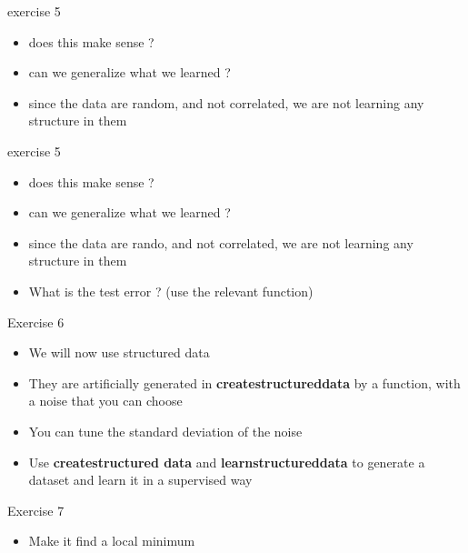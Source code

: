 \documentclass{beamer}
\begin{document}
\begin{frame}{exercise 5}
    \begin{itemize}
        \item does this make sense ?
            \item can we generalize what we learned ?
                \item since the data are random, and not correlated, we are not
                    learning any structure in them
    \end{itemize}
\end{frame}


\begin{frame}{exercise 5}
    \begin{itemize}
        \item does this make sense ?
            \item can we generalize what we learned ?
                \item since the data are rando, and not correlated, we are not
                    learning any structure in them
                \item What is the test error ? (use the relevant function)
    \end{itemize}
\end{frame}

\begin{frame}{Exercise 6}
    \begin{itemize}
        \item We will now use structured data
            \item They are artificially generated in
                \textbf{{create\textunderscore structured\textunderscore data}} by a function, with a noise that you can choose
                \item You can tune the standard deviation of the noise
            \item Use \textbf{{create\textunderscore structured\textunderscore
                data}} and \textbf{{learn\textunderscore structured\textunderscore data}} to generate a dataset and learn it in a
                supervised way
    \end{itemize}
\end{frame}


\begin{frame}{Exercise 7}
    \begin{itemize}
    \item Make it find a local minimum
    \end{itemize}
\end{frame}
\end{document}
